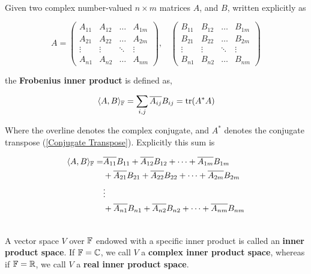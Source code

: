 \begin{definition}\label{Definition 6.4}
	\hfill\\
	Given two complex number-valued $n \times m$ matrices $A$, and $B$, written explicitly as

	\[A = \begin{pmatrix}
			A_{11} & A_{12} & \dots  & A_{1m} \\
			A_{21} & A_{22} & \dots  & A_{2m} \\
			\vdots & \vdots & \ddots & \vdots \\
			A_{n1} & A_{n2} & \dots  & A_{nm}
		\end{pmatrix},\ \ \ \ \begin{pmatrix}
			B_{11} & B_{12} & \dots  & B_{1m} \\
			B_{21} & B_{22} & \dots  & B_{2m} \\
			\vdots & \vdots & \ddots & \vdots \\
			B_{n1} & B_{n2} & \dots  & B_{nm}
		\end{pmatrix}\]

	the \textbf{Frobenius inner product} is defined as,

	\[\langle A, B\rangle_{\mathbb{F}} = \sum_{i,j}\overline{A_{ij}}B_{ij} = \text{tr}(A^*A)\]

	Where the overline denotes the complex conjugate, and $A^*$ denotes the conjugate transpose (\autoref{Conjugate Transpose}). Explicitly this sum is

	\[\begin{aligned}
		\langle A,B\rangle_{\mathbb{F}} = & \overline{A_{11}}B_{11} + \overline{A_{12}}B_{12} + \dots + \overline{A_{1m}}B_{1m}   \\
		              & + \overline{A_{21}}B_{21} + \overline{A_{22}}B_{22} + \dots + \overline{A_{2m}}B_{2m} \\
		              & \vdots                                                                                \\
		              & + \overline{A_{n1}}B_{n1} + \overline{A_{n2}}B_{n2} + \dots + \overline{A_{nm}}B_{nm} \\
	\end{aligned}\]
\end{definition}

\begin{definition}
	\hfill\\
	A vector space $V$ over $\mathbb{F}$ endowed with a specific inner product is called an \textbf{inner product space}. If $\mathbb{F}=\mathbb{C}$, we call $V$ a \textbf{complex inner product space}, whereas if $\mathbb{F} = \mathbb{R}$, we call $V$ a \textbf{real inner product space}.
\end{definition}

